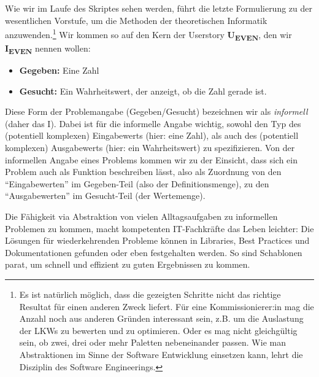 Wie wir im Laufe des Skriptes sehen werden,
führt die letzte Formulierung zu der wesentlichen Vorstufe,
um die Methoden der theoretischen Informatik anzuwenden.\footnote{
Es ist natürlich möglich,
dass die gezeigten Schritte nicht das richtige Resultat für einen anderen Zweck liefert.
Für eine Kommissionierer:in mag die Anzahl noch aus anderen Gründen interessant sein,
z.B. um die Auslastung der LKWs zu bewerten und zu optimieren.
Oder es mag nicht gleichgültig sein, ob zwei, drei oder mehr Paletten nebeneinander passen.
Wie man Abstraktionen im Sinne der Software Entwicklung einsetzen kann,
lehrt die Disziplin des Software Engineerings.}
Wir kommen so auf den Kern der Userstory \textbf{U\textsubscript{EVEN}},
den wir \textbf{I\textsubscript{EVEN}} nennen wollen:
\begin{itemize}
    \item \textbf{Gegeben:} Eine Zahl
    \item \textbf{Gesucht:} Ein Wahrheitswert, der anzeigt, ob die Zahl gerade ist.
\end{itemize}
Diese Form der Problemangabe (Gegeben/Gesucht) bezeichnen wir als \emph{informell}
(daher das I).
Dabei ist für die informelle Angabe wichtig,
sowohl den Typ des (potentiell komplexen) Eingabewerts (hier: eine Zahl),
als auch des (potentiell komplexen) Ausgabewerts (hier: ein Wahrheitswert) zu spezifizieren.
Von der informellen Angabe eines Problems kommen wir zu der Einsicht,
dass sich ein Problem auch als Funktion beschreiben lässt,
also als Zuordnung von den ``Eingabewerten'' im Gegeben-Teil
(also der Definitionsmenge),
zu den ``Ausgabewerten'' im Gesucht-Teil
(der Wertemenge).

Die Fähigkeit via Abstraktion von vielen Alltagsaufgaben zu informellen Problemen zu kommen,
macht kompetenten IT-Fachkräfte das Leben leichter:
Die Lösungen für wiederkehrenden Probleme können
in Libraries, Best Practices und Dokumentationen gefunden oder eben festgehalten werden.
So sind Schablonen parat,
um schnell und effizient zu guten Ergebnissen zu kommen.

